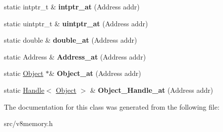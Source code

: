 \begin{DoxyCompactItemize}
\item 
\hypertarget{classv8_1_1internal_1_1_memory_ac630a62dd8be6165db3ada9770397953}{}static intptr\+\_\+t \& {\bfseries intptr\+\_\+at} (Address addr)\label{classv8_1_1internal_1_1_memory_ac630a62dd8be6165db3ada9770397953}

\item 
\hypertarget{classv8_1_1internal_1_1_memory_ae19c9eb8301d712ea2706f5e351d18f9}{}static uintptr\+\_\+t \& {\bfseries uintptr\+\_\+at} (Address addr)\label{classv8_1_1internal_1_1_memory_ae19c9eb8301d712ea2706f5e351d18f9}

\item 
\hypertarget{classv8_1_1internal_1_1_memory_ae6df6e6ff180d5ca8d3b1e03c528a5a4}{}static double \& {\bfseries double\+\_\+at} (Address addr)\label{classv8_1_1internal_1_1_memory_ae6df6e6ff180d5ca8d3b1e03c528a5a4}

\item 
\hypertarget{classv8_1_1internal_1_1_memory_a4e3a386530c273fb87e684a6cfd65c19}{}static Address \& {\bfseries Address\+\_\+at} (Address addr)\label{classv8_1_1internal_1_1_memory_a4e3a386530c273fb87e684a6cfd65c19}

\item 
\hypertarget{classv8_1_1internal_1_1_memory_a44b9d30b0f35df05e29aca423839b4f5}{}static \hyperlink{classv8_1_1internal_1_1_object}{Object} $\ast$\& {\bfseries Object\+\_\+at} (Address addr)\label{classv8_1_1internal_1_1_memory_a44b9d30b0f35df05e29aca423839b4f5}

\item 
\hypertarget{classv8_1_1internal_1_1_memory_a7bf33a8f563caacf69f741bbae4f74e9}{}static \hyperlink{classv8_1_1internal_1_1_handle}{Handle}$<$ \hyperlink{classv8_1_1internal_1_1_object}{Object} $>$ \& {\bfseries Object\+\_\+\+Handle\+\_\+at} (Address addr)\label{classv8_1_1internal_1_1_memory_a7bf33a8f563caacf69f741bbae4f74e9}

\end{DoxyCompactItemize}


The documentation for this class was generated from the following file\+:\begin{DoxyCompactItemize}
\item 
src/v8memory.\+h\end{DoxyCompactItemize}
